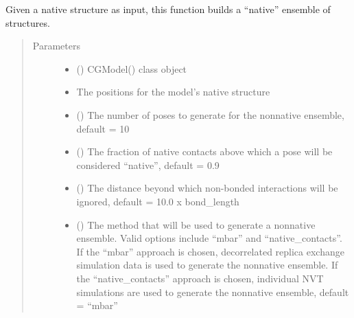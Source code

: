 \documentclass[letterpaper,12pt,english,openany,oneside]{sphinxmanual}
\begin{document}
\begin{fulllineitems}
\label{\detokenize{ensembles:ensembles.ens_build.get_native_ensemble}}
Given a native structure as input, this function builds a “native” ensemble of structures.
\begin{quote}\begin{description}
\item[{Parameters}] \leavevmode\begin{itemize}
\item {} 
 () \textendash{} CGModel() class object

\item {} 
 \textendash{} The positions for the model’s native structure

\item {} 
 () \textendash{} The number of poses to generate for the nonnative ensemble, default = 10

\item {} 
 () \textendash{} The fraction of native contacts above which a pose will be considered “native”, default = 0.9

\item {} 
 () \textendash{} The distance beyond which non-bonded interactions will be ignored, default = 10.0 x bond\_length

\item {} 
 () \textendash{} The method that will be used to generate a nonnative ensemble.  Valid options include “mbar” and “native\_contacts”.  If the “mbar” approach is chosen, decorrelated replica exchange simulation data is used to generate the nonnative ensemble.  If the “native\_contacts” approach is chosen, individual NVT simulations are used to generate the nonnative ensemble, default = “mbar”


\end{itemize}
\end{description}
\end{quote}
\end{fulllineitems}
\end{document}
